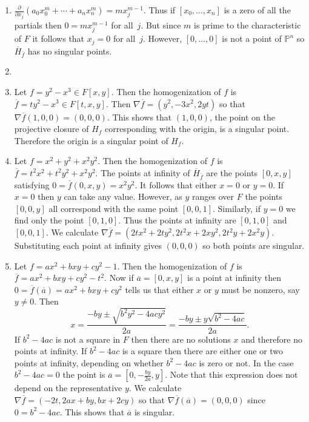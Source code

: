 \documentclass[12pt]{article}
\begin{document}
\begin{enumerate}
\item %
$\frac{\partial}{\partial x_j}
\left(a_0x_0^m+\cdots+a_nx_n^m\right)=
mx_j^{m-1}$. Thus if $\left[x_0,\ldots,x_n\right]$
is a zero of all the partials
then $0=mx_j^{m-1}$ for all~$j$. But since $m$ is prime
to the characteristic of $F$ it follows that $x_j=0$ for all~$j$.
However, $\left[0,\ldots,0\right]$ is not a point of
$\mathbb{P}^n$ so $\overline{H}_{\overline{f}}$ has no singular points.

\item %
\item %
Let $f=y^2-x^3\in F\left[x,y\right]$.
Then the homogenization of $f$
is $\overline{f}=ty^2-x^3\in F\left[t,x,y\right]$.
Then $\nabla\overline{f}=\left(y^2,-3x^2,2yt\right)$ so that
$\nabla\overline{f}\left(1,0,0\right)
=\left(0,0,0\right)$. This shows that $\left(1,0,0\right)$,
the point on the projective closure
of $H_f$ corresponding with the origin, is a singular point.
Therefore the origin is a singular point of $H_f$.

\item %
Let $f=x^2+y^2+x^2y^2$. Then the homogenization of $f$
is $\overline{f}=t^2x^2+t^2y^2+x^2y^2$. The points at infinity
of $\overline{H}_{\overline{f}}$ are the points $\left[0,x,y\right]$
satisfying $0=\overline{f}\left(0,x,y\right)=x^2y^2$.
It follows that either $x=0$ or $y=0$. If $x=0$ then $y$
can take any value. However, as $y$ ranges over $F$ the points
$\left[0,0,y\right]$ all correspond with the same point
$\left[0,0,1\right]$. Similarly, if $y=0$ we find only
the point $\left[0,1,0\right]$. Thus the points at infinity are
$\left[0,1,0\right]$ and $\left[0,0,1\right]$.
We calculate $\nabla\overline{f}
=\left(2tx^2+2ty^2,2t^2x+2xy^2,2t^2y+2x^2y\right)$.
Substituting each point at infinity gives $\left(0,0,0\right)$
so both points are singular.

\item %
Let $f=ax^2+bxy+cy^2-1$. Then the homogenization of $f$
is $\overline{f}=ax^2+bxy+cy^2-t^2$. Now if
$\overline{a}=\left[0,x,y\right]$ is a point at infinity
then $0=\overline{f}\left(\overline{a}\right)=ax^2+bxy+cy^2$ tells us
that either $x$ or $y$ must be nonzero, say $y\ne 0$. Then
\[x=\frac{-by\pm\sqrt{b^2y^2-4acy^2}}{2a}
=\frac{-by\pm y\sqrt{b^2-4ac}}{2a}.\]
If $b^2-4ac$ is not a square in $F$ then there are no solutions
$x$ and therefore no points at infinity.
If $b^2-4ac$ is a square then there are either
one or two points at infinity, depending on whether $b^2-4ac$
is zero or not. In the case $b^2-4ac=0$ the point
is $\overline{a}=\left[0,-\frac{by}{2a},y\right]$.
Note that this expression does not depend on the representative $y$.
We calculate $\nabla\overline{f}=\left(
-2t,2ax+by,bx+2cy\right)$ so that
$\nabla\overline{f}\left(\overline{a}\right)=\left(
0,0,0\right)$ since $0=b^2-4ac$.
This shows that $\overline{a}$ is singular.


\end{enumerate}
\end{document}

